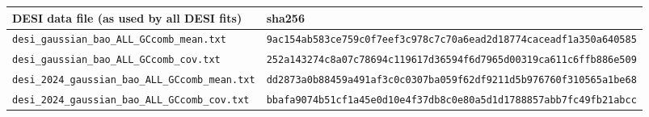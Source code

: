 \begin{tabular}{ll}
\toprule
DESI data file (as used by all DESI fits) & sha256 \\
\midrule
\scriptsize\texttt{desi\_gaussian\_bao\_ALL\_GCcomb\_mean.txt} & \scriptsize\texttt{9ac154ab583ce759c0f7eef3c978c7c70a6ead2d18774caceadf1a350a640585} \\
\scriptsize\texttt{desi\_gaussian\_bao\_ALL\_GCcomb\_cov.txt} & \scriptsize\texttt{252a143274c8a07c78694c119617d36594f6d7965d00319ca611c6ffb886e509} \\
\scriptsize\texttt{desi\_2024\_gaussian\_bao\_ALL\_GCcomb\_mean.txt} & \scriptsize\texttt{dd2873a0b88459a491af3c0c0307ba059f62df9211d5b976760f310565a1be68} \\
\scriptsize\texttt{desi\_2024\_gaussian\_bao\_ALL\_GCcomb\_cov.txt} & \scriptsize\texttt{bbafa9074b51cf1a45e0d10e4f37db8c0e80a5d1d1788857abb7fc49fb21abcc} \\
\bottomrule
\end{tabular}
